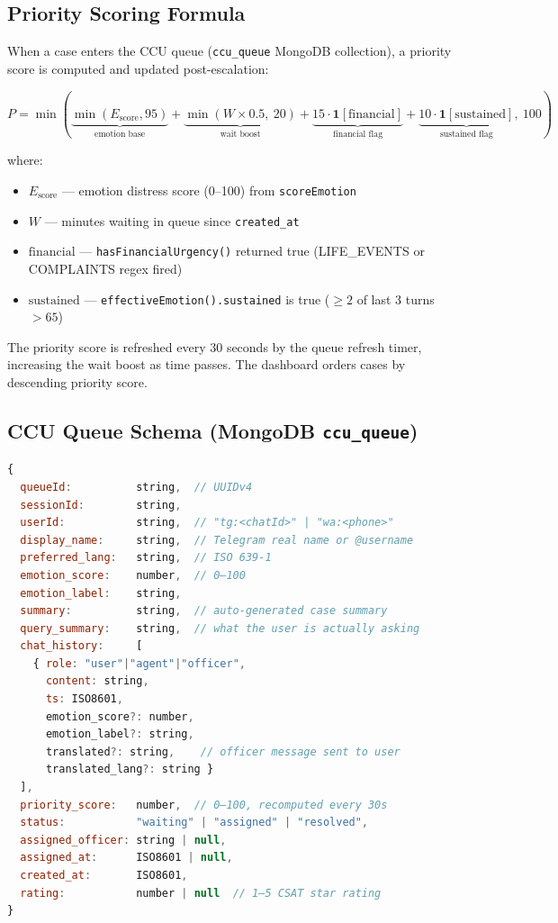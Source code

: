 \documentclass[12pt,a4paper]{article}
\begin{document}
\subsection{Priority Scoring Formula}

When a case enters the CCU queue (\texttt{ccu\_queue} MongoDB collection),
a priority score is computed and updated post-escalation:

\[
P = \min\!\left(
  \underbrace{\min(E_{\text{score}}, 95)}_{\text{emotion base}}
  + \underbrace{\min(W \times 0.5,\ 20)}_{\text{wait boost}}
  + \underbrace{15 \cdot \mathbf{1}[\text{financial}]}_{\text{financial flag}}
  + \underbrace{10 \cdot \mathbf{1}[\text{sustained}]}_{\text{sustained flag}},
\ 100\right)
\]

where:
\begin{itemize}[noitemsep]
  \item $E_{\text{score}}$ — emotion distress score (0–100) from \texttt{scoreEmotion}
  \item $W$ — minutes waiting in queue since \texttt{created\_at}
  \item $\text{financial}$ — \texttt{hasFinancialUrgency()} returned true (LIFE\_EVENTS or COMPLAINTS regex fired)
  \item $\text{sustained}$ — \texttt{effectiveEmotion().sustained} is true ($\geq2$ of last 3 turns $>65$)
\end{itemize}

The priority score is refreshed every 30 seconds by the queue refresh timer,
increasing the wait boost as time passes. The dashboard orders cases by descending
priority score.

\subsection{CCU Queue Schema (MongoDB \texttt{ccu\_queue})}

\begin{lstlisting}[language=JavaScript]
{
  queueId:          string,  // UUIDv4
  sessionId:        string,
  userId:           string,  // "tg:<chatId>" | "wa:<phone>"
  display_name:     string,  // Telegram real name or @username
  preferred_lang:   string,  // ISO 639-1
  emotion_score:    number,  // 0–100
  emotion_label:    string,
  summary:          string,  // auto-generated case summary
  query_summary:    string,  // what the user is actually asking
  chat_history:     [
    { role: "user"|"agent"|"officer",
      content: string,
      ts: ISO8601,
      emotion_score?: number,
      emotion_label?: string,
      translated?: string,    // officer message sent to user
      translated_lang?: string }
  ],
  priority_score:   number,  // 0–100, recomputed every 30s
  status:           "waiting" | "assigned" | "resolved",
  assigned_officer: string | null,
  assigned_at:      ISO8601 | null,
  created_at:       ISO8601,
  rating:           number | null  // 1–5 CSAT star rating
}
\end{lstlisting}
\end{document}
